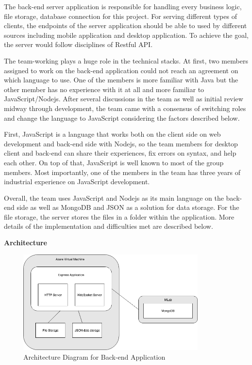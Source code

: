 \documentclass{article}
\begin{document}
The back-end server application is responsible for handling every business logic, file storage, database connection for this project. For serving different types of clients, the endpoints of the server application should be able to used by different sources including mobile application and desktop application. To achieve the goal, the server would follow disciplines of Restful API.

The team-working plays a huge role in the technical stacks. At first, two members assigned to work on the back-end application could not reach an agreement on which language to use. One of the members is more familiar with Java but the other member has no experience with it at all and more familiar to JavaScript/Nodejs. After several discussions in the team as well as initial review midway through development, the team came with a consensus of switching roles and change the language to JavaScript considering the factors described below. 

First, JavaScript is a language that works both on the client side on web development and back-end side with Nodejs, so the team members for desktop client and back-end can share their experiences, fix errors on syntax, and help each other. On top of that, JavaScript is well known to most of the group members. Most importantly, one of the members in the team has three years of industrial experience on JavaScript development. 

Overall, the team uses JavaScript and Nodejs as its main language on the back-end side as well as MongoDB and JSON as a solution for data storage. For the file storage, the server stores the files in a folder within the application. More details of the implementation and difficulties met are described below.
\newline
\item\textbf{Architecture}\newline

\begin{figure}[H]
\begin{center}
\includegraphics[width=9.5cm]{Backend_Diagram_Archietecture.png}
\end{center}
\caption{Architecture Diagram for Back-end Application}\label{ex4}
\end{figure}
\end{document}
